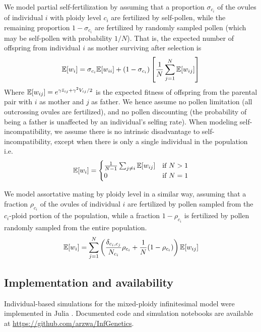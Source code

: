 \documentclass[11pt,a4paper]{article}
\begin{document}
We model partial self-fertilization by assuming that a proportion
$\sigma_{c_i}$ of the ovules of individual $i$ with ploidy level $c_i$ are
fertilized by self-pollen, while the remaining proportion $1-\sigma_{c_i}$ are
fertilized by randomly sampled pollen (which may be self-pollen with
probability $1/N$). 
That is, the expected number of offspring from individual $i$ as mother
surviving after selection is
\begin{equation}
\mathbb{E}[w_i] = \sigma_{c_i} \mathbb{E}[w_{ii}] +
  (1-\sigma_{c_i})\left[\frac{1}{N}\sum_{j=1}^N \mathbb{E}[w_{ij}]\right]
\end{equation}
Where $\mathbb{E}[w_{ij}] = e^{\gamma \bar{z}_{ij} + \gamma^2 V_{ij}/2}$ is the
expected fitness of offspring from the parental pair with $i$ as mother and $j$
as father.
We hence assume no pollen limitation (all outcrossing ovules are fertilized),
and no pollen discounting (the probability of being a father is unaffected by
an individual's selfing rate).
When modeling self-incompatibility, we assume there is no intrinsic
disadvantage to self-incompatibility, except when there is only a single
individual in the population i.e.
\begin{equation}
\mathbb{E}[w_i] = \begin{cases}
    \frac{1}{N-1}\sum_{j \ne i }\mathbb{E}[w_{ij}] & \text{if } N > 1\\ 
    0 & \text{if } N=1 \end{cases}
\end{equation}

We model assortative mating by ploidy level in a similar way, assuming that a
fraction $\rho_{c_i}$ of the ovules of individual $i$ are fertilized by pollen
sampled from the $c_i$-ploid portion of the population, while a fraction
$1-\rho_{c_i}$ is fertilized by pollen randomly sampled from the entire
population.
\begin{equation}
\mathbb{E}[w_i] = \sum_{j=1}^N \left(\frac{\delta_{c_i,c_j}}{N_{c_i}}\rho_{c_i} +
\frac{1}{N}(1-\rho_{c_i})\right)\mathbb{E}[w_{ij}]
\end{equation}

\subsection*{Implementation and availability}

Individual-based simulations for the mixed-ploidy infinitesimal model were
implemented in Julia \citep{julia}.
Documented code and simulation notebooks are available at
\url{https://github.com/arzwa/InfGenetics}.
\end{document}
